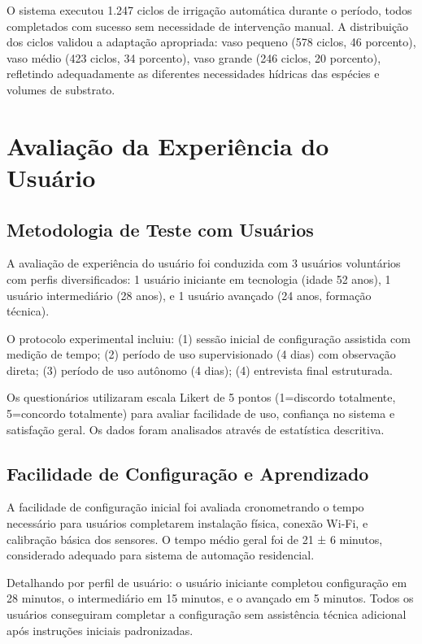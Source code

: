 \documentclass[twoside,english,brazilian]{UNISINOSmonografia}
\begin{document}
O sistema executou 1.247 ciclos de irrigação automática durante o período, todos completados com sucesso sem necessidade de intervenção manual. A distribuição dos ciclos validou a adaptação apropriada: vaso pequeno (578 ciclos, 46 porcento), vaso médio (423 ciclos, 34 porcento), vaso grande (246 ciclos, 20 porcento), refletindo adequadamente as diferentes necessidades hídricas das espécies e volumes de substrato.

\section{Avaliação da Experiência do Usuário}

\subsection{Metodologia de Teste com Usuários}

A avaliação de experiência do usuário foi conduzida com 3 usuários voluntários com perfis diversificados: 1 usuário iniciante em tecnologia (idade 52 anos), 1 usuário intermediário (28 anos), e 1 usuário avançado (24 anos, formação técnica).

O protocolo experimental incluiu: (1) sessão inicial de configuração assistida com medição de tempo; (2) período de uso supervisionado (4 dias) com observação direta; (3) período de uso autônomo (4 dias); (4) entrevista final estruturada.

Os questionários utilizaram escala Likert de 5 pontos (1=discordo totalmente, 5=concordo totalmente) para avaliar facilidade de uso, confiança no sistema e satisfação geral. Os dados foram analisados através de estatística descritiva.

\subsection{Facilidade de Configuração e Aprendizado}

A facilidade de configuração inicial foi avaliada cronometrando o tempo necessário para usuários completarem instalação física, conexão Wi-Fi, e calibração básica dos sensores. O tempo médio geral foi de 21 ± 6 minutos, considerado adequado para sistema de automação residencial.

Detalhando por perfil de usuário: o usuário iniciante completou configuração em 28 minutos, o intermediário em 15 minutos, e o avançado em 5 minutos. Todos os usuários conseguiram completar a configuração sem assistência técnica adicional após instruções iniciais padronizadas.
\end{document}
